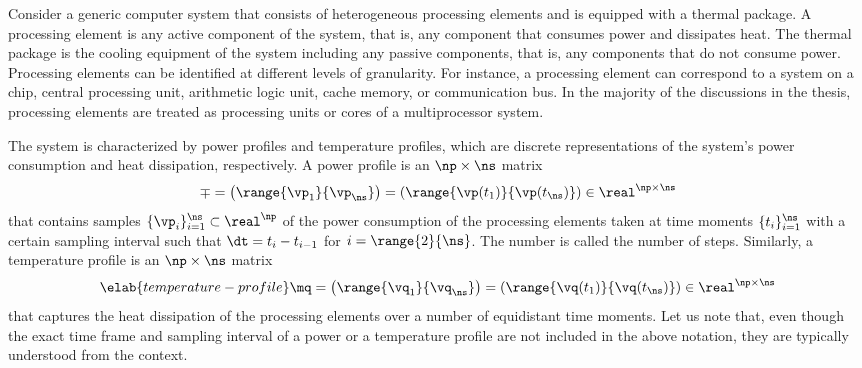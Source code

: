Consider a generic computer system that consists of \np heterogeneous processing
elements and is equipped with a thermal package. A processing element is any
active component of the system, that is, any component that consumes power and
dissipates heat. The thermal package is the cooling equipment of the system
including any passive components, that is, any components that do not consume
power. Processing elements can be identified at different levels of granularity.
For instance, a processing element can correspond to a system on a chip, central
processing unit, arithmetic logic unit, cache memory, or communication bus. In
the majority of the discussions in the thesis, processing elements are treated
as processing units or cores of a multiprocessor system.

The system is characterized by power profiles and temperature profiles, which
are discrete representations of the system's power consumption and heat
dissipation, respectively. A power profile is an $\np \times \ns$ matrix
\[
  \mp
  = \left(\range{\vp_1}{\vp_\ns}\right)
  = \left(\range{\vp(t_1)}{\vp(t_\ns)}\right) \in \real^{\np \times \ns}
\]
that contains \ns samples $\{ \vp_i \}_{i = 1}^\ns \subset \real^\np$ of the
power consumption of the \np processing elements taken at \ns time moments $\{
t_i \}_{i = 1}^\ns$ with a certain sampling interval \dt such that $\dt = t_i -
t_{i - 1}$ for $i = \range{2}{\ns}$. The number \ns is called the number of
steps. Similarly, a temperature profile is an $\np \times \ns$ matrix
\begin{equation} \elab{temperature-profile}
  \mq
  = \left(\range{\vq_1}{\vq_\ns}\right)
  = \left(\range{\vq(t_1)}{\vq(t_\ns)}\right) \in \real^{\np \times \ns}
\end{equation}
that captures the heat dissipation of the processing elements over a number of
equidistant time moments. Let us note that, even though the exact time frame and
sampling interval of a power or a temperature profile are not included in the
above notation, they are typically understood from the context.
